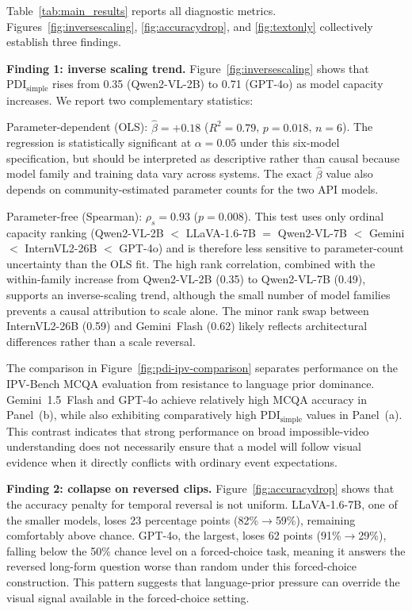 \documentclass[final,5p,times,twocolumn]{elsarticle}
\newcommand{\PDI}{\mathrm{PDI}}
\begin{document}
Table~\ref{tab:main_results} reports all diagnostic metrics.
Figures~\ref{fig:inversescaling}, \ref{fig:accuracydrop}, and
\ref{fig:textonly} collectively establish three findings.

\textbf{Finding 1: inverse scaling trend.}
Figure~\ref{fig:inversescaling} shows that $\PDI_{\mathrm{simple}}$
rises from 0.35 (Qwen2-VL-2B) to 0.71 (GPT-4o) as model capacity
increases. We report two complementary statistics:

\noindent Parameter-dependent (OLS):
$\hat{\beta}=+0.18$ ($R^2=0.79$, $p=0.018$, $n=6$).
The regression is statistically significant at $\alpha=0.05$ under this
six-model specification, but should be interpreted as descriptive rather
than causal because model family and training data vary across systems.
The exact $\hat{\beta}$ value also depends on community-estimated
parameter counts for the two API models.

\noindent Parameter-free (Spearman):
$\rho_s=0.93$ ($p=0.008$).
This test uses only ordinal capacity ranking
(Qwen2-VL-2B $<$ LLaVA-1.6-7B $=$ Qwen2-VL-7B $<$ Gemini $<$
InternVL2-26B $<$ GPT-4o) and is therefore less sensitive to
parameter-count uncertainty than the OLS fit.
The high rank correlation, combined with the within-family
increase from Qwen2-VL-2B (0.35) to Qwen2-VL-7B (0.49), supports an
inverse-scaling trend, although the small number of model families
prevents a causal attribution to scale alone. The minor rank swap between
InternVL2-26B (0.59) and Gemini~Flash (0.62) likely reflects architectural
differences rather than a scale reversal.

The comparison in Figure~\ref{fig:pdi-ipv-comparison} separates performance
on the IPV-Bench MCQA evaluation from resistance to language prior dominance.
Gemini~1.5~Flash and GPT-4o achieve relatively high MCQA accuracy in
Panel~(b), while also exhibiting
comparatively high $\PDI_{\mathrm{simple}}$ values in Panel~(a). This
contrast indicates that strong performance on broad impossible-video
understanding does not necessarily ensure that a model will follow visual
evidence when it directly conflicts with ordinary event expectations.


\textbf{Finding 2: collapse on reversed clips.}
Figure~\ref{fig:accuracydrop} shows that the accuracy penalty for
temporal reversal is not uniform. LLaVA-1.6-7B, one of the smaller models,
loses 23 percentage points (82\%$\to$59\%), remaining comfortably
above chance. GPT-4o, the largest, loses 62 points (91\%$\to$29\%),
falling below the 50\% chance level on a forced-choice task,
meaning it answers the reversed long-form question worse than
random under this forced-choice construction. This pattern suggests that
language-prior pressure can override the visual signal available in the
forced-choice setting.
\end{document}
